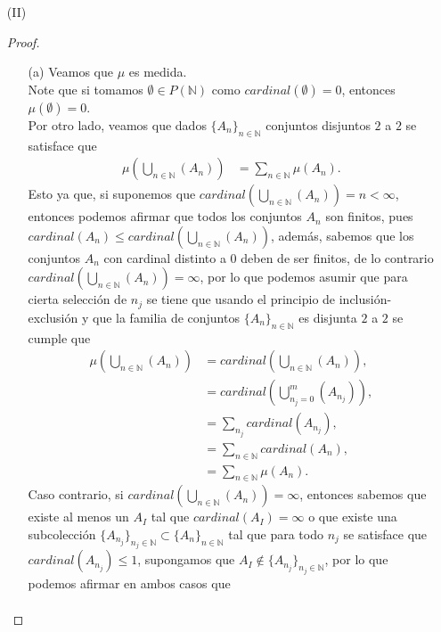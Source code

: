 \begin{enumerate}
\item[(II)]\phantom{I}\\
\begin{proof} 
  \begin{enumerate}
    \item[(a)] Veamos que $\mu$ es medida.\\
      Note que si tomamos $\emptyset\in P(\mathbb{N})$ como $cardinal(\emptyset)=0$, entonces $\mu(\emptyset)=0$.\\
      Por otro lado, veamos que dados $\{A_{n}\}_{n\in\mathbb{N}}$ conjuntos disjuntos $2$ a $2$ se satisface que
      \begin{align*}
        \mu\left( \bigcup_{n\in\mathbb{N}}(A_{n}) \right)&=\sum_{n\in\mathbb{N}}\mu\left( A_{n} \right).
      \end{align*}
      Esto ya que, si suponemos que $cardinal\left( \bigcup_{n\in\mathbb{N}}(A_{n}) \right)=n<\infty$, entonces podemos afirmar que todos los conjuntos $A_{n}$ son finitos, pues $cardinal\left( A_{n} \right)\leq cardinal\left( \bigcup_{n\in\mathbb{N}}(A_{n}) \right)$, además, sabemos que los conjuntos $A_{n}$ con cardinal distinto a $0$ deben de ser finitos, de lo contrario $cardinal\left(\bigcup_{n\in\mathbb{N}}(A_{n})\right)=\infty$, por lo que podemos asumir que para cierta selección de $n_{j}$ se tiene que usando el principio de inclusión-exclusión y que la familia de conjuntos $\{A_{n}\}_{n\in\mathbb{N}}$ es disjunta $2$ a $2$ se cumple que
      \begin{align*}
        \mu\left( \bigcup_{n\in\mathbb{N}}(A_{n}) \right)&=cardinal\left(\bigcup_{n\in\mathbb{N}}(A_{n})\right),\\
        &=cardinal\left( \bigcup_{n_{j}=0}^{m}(A_{n_{j}}) \right),\\
        &=\sum_{n_{j}}cardinal\left( A_{n_{j}} \right),\\
        &=\sum_{n\in\mathbb{N}}cardinal\left( A_{n} \right),\\
        &=\sum_{n\in\mathbb{N}}\mu(A_{n}).
      \end{align*}
      Caso contrario, si $cardinal\left( \bigcup_{n\in\mathbb{N}}(A_{n}) \right)=\infty$, entonces sabemos que existe al menos un $A_{I}$ tal que $cardinal(A_I)=\infty$ o que existe una subcolección $\{A_{n_{j}}\}_{n_{j}\in\mathbb{N}}\subset \{A_{n}\}_{n\in\mathbb{N}}$ tal que para todo $n_{j}$ se satisface que $cardinal\left( A_{n_{j}} \right)\leq 1$, supongamos que $A_I\notin \{A_{n_{j}}\}_{n_j\in\mathbb{N}}$, por lo que podemos afirmar en ambos casos que
      \begin{align*}

\end{align*}
\end{enumerate}
\end{proof}
\end{enumerate}

